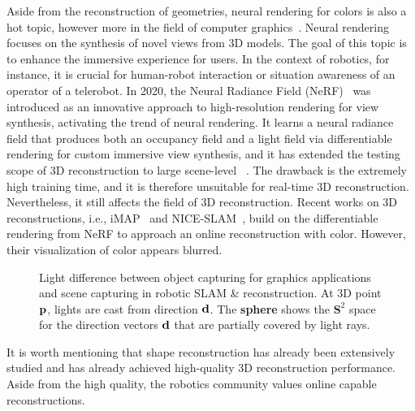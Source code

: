 Aside from the reconstruction of geometries, neural rendering for colors is also a hot topic, however more in the field of computer graphics~\cite{tewari2021advances}.
Neural rendering focuses on the synthesis of novel views from 3D models. 
The goal of this topic is to enhance the immersive experience for users. In the context of robotics, for instance, it is crucial for human-robot interaction or situation awareness of an operator of a telerobot. 
In 2020, the Neural Radiance Field (NeRF)~\cite{mildenhall2020nerf} was introduced as an innovative approach to high-resolution rendering for view synthesis, activating the trend of neural rendering.
It learns a neural radiance field that produces both an occupancy field and a light field via differentiable rendering for custom immersive view synthesis, and it has extended the testing scope of 3D reconstruction to large scene-level
~\cite{tancik2022block,zhang2022nerfusion}.
The drawback is the extremely high training time, and it is therefore unsuitable for real-time 3D reconstruction.
Nevertheless, it still affects the field of 3D reconstruction.
Recent works on 3D reconstructions, i.e., iMAP~\cite{sucar2021imap} and NICE-SLAM~\cite{zhu2022nice}, build on the differentiable rendering from NeRF to approach an online reconstruction with color.
However,
their visualization of color appears blurred.
\begin{figure}[t]%
	\centering
	\caption{Light difference between object capturing for graphics applications and scene capturing in robotic SLAM \& reconstruction. At 3D point $\mathbf p$, lights are cast from direction $\mathbf d$. The \textbf{sphere} shows the $\mathbf S^2$ space for the direction vectors $\mathbf d$ that are partially covered by light rays.}
	\label{fig:limited_light}
	\vspace{-.5cm}
\end{figure}
It is worth mentioning that shape reconstruction has already been extensively studied and has already achieved high-quality 3D reconstruction performance. Aside from the high quality, the robotics community values online capable reconstructions.

